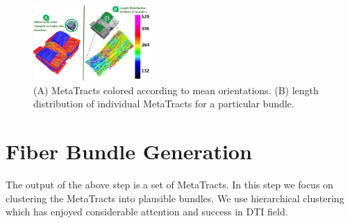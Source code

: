 




\begin{figure}[h]
\centering
	\includegraphics[width=0.4\textwidth]{imagesMT2014/crop-16/length_dist.png}
	\caption{(A) MetaTracts colored according to mean orientations. (B) length distribution of individual MetaTracts for a particular bundle.}
	\label{fig:length_distribution}
\end{figure}

\section {Fiber Bundle Generation}
\label{subsec:fiber-bundles}
The output of the above step is a set of MetaTracts. In this step we focus on clustering the MetaTracts into plausible bundles. We use hierarchical clustering which has enjoyed considerable attention and success in DTI field. 

